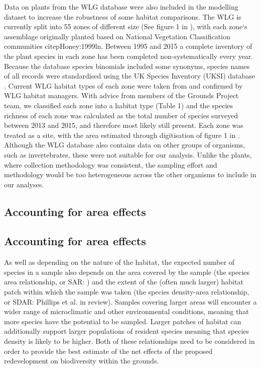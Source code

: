 Data on plants from the WLG database were also included in the modelling dataset to increase the robustness of some habitat comparisons. The WLG is currently split into 55 zones of different size (See figure 1 in \citealt{Leigh:2003ln}), with each zone`s assemblage originally planted based on National Vegetation Classification communities citep{Honey:1999ln}. Between 1995 and 2015 a complete inventory of the plant species in each zone has been completed non-systematically every year. Because the database species binomials included some synonyms, species names of all records were standardised using the UK Species Inventory (UKSI) database \citep{Raper:2014wg}. Current WLG habitat types of each zone were taken from \citep{Leigh:2003ln} and confirmed by WLG habitat managers. With advice from members of the Grounds Project team, we classified each zone into a habitat type (Table 1) and the species richness of each zone was calculated as the total number of species surveyed between 2013 and 2015, and therefore most likely still present. Each zone was treated as a site, with the area estimated through digitisation of figure 1 in \cite{Leigh:2003ln}. Although the WLG database also contains data on other groups of organisms, such as invertebrates, these were not suitable for our analysis. Unlike the plants, where collection methodology was consistent, the sampling effort and methodology would be too heterogeneous across the other organisms to include in our analyses.

\ifappendixStyle %
\subsection{Accounting for area effects}%
\else
\subsection*{Accounting for area effects}
\fi
As well as depending on the nature of the habitat, the expected number of species in a sample also depends on the area covered by the sample (the species area relationship, or SAR: \citealt{rosenzweig:1995species}) and the extent of the (often much larger) habitat patch within which the sample was taken (the species density-area relationship, or SDAR: Phillips et al. in review). Samples covering larger areas will encounter a wider range of microclimatic and other environmental conditions, meaning that more species have the potential to be sampled. Larger patches of habitat can additionally support larger populations of resident species meaning that species density is likely to be higher. Both of these relationships need to be considered in order to provide the best estimate of the net effects of the proposed redevelopment on biodiversity within the grounds.

